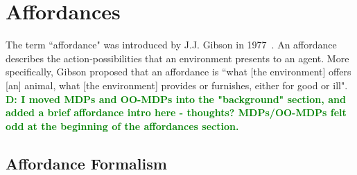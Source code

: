 \documentclass[conference]{IEEEtran}
\newcommand{\dnote}[1]{\textcolor{Green}{\textbf{D: #1}}}
\begin{document}




\section{Affordances}
\label{sec:affordances}

The term ``affordance" was introduced by J.J. Gibson in 1977~\citep{gibson77}. An 
affordance describes the action-possibilities that an environment presents to an agent.
More specifically, Gibson proposed that an affordance is ``what [the environment] offers
[an] animal, what [the environment] provides or furnishes, either for good or ill".
\dnote{I moved MDPs and OO-MDPs into the "background" section, and added a brief affordance intro here - thoughts? MDPs/OO-MDPs felt odd at the beginning of the affordances section.}

\subsection{Affordance Formalism}
\end{document}
